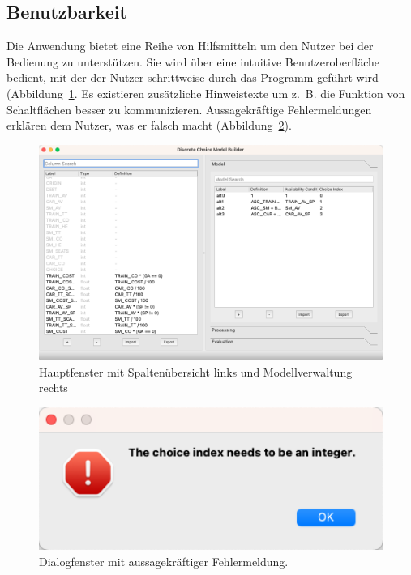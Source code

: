 \documentclass{article}
\begin{document}
\subsection{Benutzbarkeit}

Die Anwendung bietet eine Reihe von Hilfsmitteln um den Nutzer bei der Bedienung zu unterstützen. Sie wird über eine intuitive Benutzeroberfläche bedient, mit der der Nutzer schrittweise durch das Programm geführt wird (Abbildung~\ref{gui:fig_columns+model}. Es existieren zusätzliche Hinweistexte um z.~B. die Funktion von Schaltflächen besser zu kommunizieren. Aussagekräftige Fehlermeldungen erklären dem Nutzer, was er falsch macht (Abbildung~\ref{gui:fig_error-dialog-example}).\\

\begin{figure}[H]%
  \centering
  \includegraphics[width=12cm]{img/gui/columns+model.png}
  \caption{Hauptfenster mit Spaltenübersicht links und Modellverwaltung rechts}
  \label{gui:fig_columns+model}
\end{figure}

\begin{figure}[H]%
  \centering
  \includegraphics[width=12cm]{img/gui/error-dialog-example.png}
  \caption{Dialogfenster mit aussagekräftiger Fehlermeldung.}
  \label{gui:fig_error-dialog-example}
\end{figure}
\end{document}
